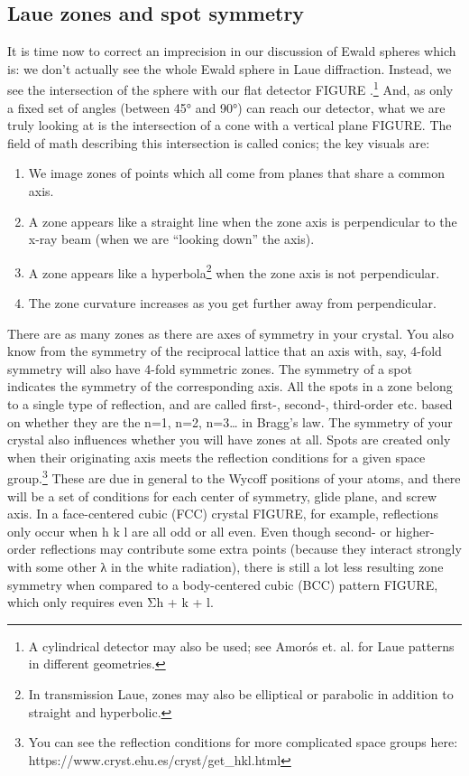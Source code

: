 \subsection{Laue zones and spot symmetry}
It is time now to correct an imprecision in our discussion of Ewald spheres which is: we don’t actually see the whole Ewald sphere in Laue diffraction. Instead, we see the intersection of the sphere with our flat detector FIGURE .\footnote{A cylindrical detector may also be used; see Amorós et. al. for Laue patterns in different geometries.} And, as only a fixed set of angles (between 45° and 90°) can reach our detector, what we are truly looking at is the intersection of a cone with a vertical plane FIGURE. The field of math describing this intersection is called conics; the key visuals are:
\begin{enumerate}
    \item We image zones of points which all come from planes that share a common axis.
    \item A zone appears like a straight line when the zone axis is perpendicular to the x-ray beam (when we are “looking down” the axis).
    \item A zone appears like a hyperbola\footnote{In transmission Laue, zones may also be elliptical or parabolic in addition to straight and hyperbolic.} when the zone axis is not perpendicular.
    \item The zone curvature increases as you get further away from perpendicular.
\end{enumerate}
There are as many zones as there are axes of symmetry in your crystal. You also know from the symmetry of the reciprocal lattice that an axis with, say, 4-fold symmetry will also have 4-fold symmetric zones. The symmetry of a spot indicates the symmetry of the corresponding axis. All the spots in a zone belong to a single type of reflection, and are called first-, second-, third-order etc. based on whether they are the n=1, n=2, n=3… in Bragg’s law.
The symmetry of your crystal also influences whether you will have zones at all. Spots are created only when their originating axis meets the reflection conditions for a given space group.\footnote{You can see the reflection conditions for more complicated space groups here: https://www.cryst.ehu.es/cryst/get_hkl.html } These are due in general to the Wycoff positions of your atoms, and there will be a set of conditions for each center of symmetry, glide plane, and screw axis. In a face-centered cubic (FCC) crystal FIGURE, for example, reflections only occur when h k l are all odd or all even. Even though second- or higher-order reflections may contribute some extra points (because they interact strongly with some other λ in the white radiation), there is still a lot less resulting zone symmetry when compared to a body-centered cubic (BCC) pattern FIGURE, which only requires even Σh + k + l.

